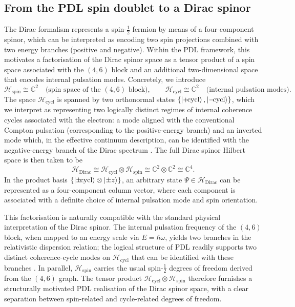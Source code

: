 \documentclass[11pt,a4paper]{article}
\theoremstyle{definition}
\newcommand{\Hspin}{\mathcal{H}_{\mathrm{spin}}}
\newcommand{\Hcycl}{\mathcal{H}_{\mathrm{cycl}}}
\newcommand{\HDirac}{\mathcal{H}_{\mathrm{Dirac}}}
\begin{document}
\subsection{From the PDL spin doublet to a Dirac spinor}

The Dirac formalism represents a spin-$\tfrac{1}{2}$ fermion by means of a four-component spinor, which can be interpreted as encoding two spin projections combined with two energy branches (positive and negative). Within the PDL framework, this motivates a factorisation of the Dirac spinor space as a tensor product of a spin space associated with the $(4,6)$ block and an additional two-dimensional space that encodes internal pulsation modes. Concretely, we introduce
\[
\Hspin \cong \mathbb{C}^2 \quad \text{(spin space of the $(4,6)$ block)}, \qquad \Hcycl \cong \mathbb{C}^2 \quad \text{(internal pulsation modes)}.
\]
The space $\Hcycl$ is spanned by two orthonormal states $\{\ket{+\!\text{cycl}},\ket{-\!\text{cycl}}\}$, which we interpret as representing two logically distinct regimes of internal coherence cycles associated with the electron: a mode aligned with the conventional Compton pulsation (corresponding to the positive-energy branch) and an inverted mode which, in the effective continuum description, can be identified with the negative-energy branch of the Dirac spectrum \cite{PDL,PDL_Global_Mapping_Structures_Results_Open_Problems}. The full Dirac spinor Hilbert space is then taken to be
\[
\HDirac \cong \Hcycl \otimes \Hspin \cong \mathbb{C}^2 \otimes \mathbb{C}^2 \cong \mathbb{C}^4.
\]
In the product basis $\{\ket{\pm\!\text{cycl}}\otimes\ket{\pm z}\}$, an arbitrary state $\Psi \in \HDirac$ can be represented as a four-component column vector, where each component is associated with a definite choice of internal pulsation mode and spin orientation.

This factorisation is naturally compatible with the standard physical interpretation of the Dirac spinor. The internal pulsation frequency of the $(4,6)$ block, when mapped to an energy scale via $E = \hbar\omega$, yields two branches in the relativistic dispersion relation; the logical structure of PDL readily supports two distinct coherence-cycle modes on $\Hcycl$ that can be identified with these branches \cite{PDL,PDL_introduction}. In parallel, $\Hspin$ carries the usual spin-$\tfrac{1}{2}$ degrees of freedom derived from the $(4,6)$ graph. The tensor product $\Hcycl \otimes \Hspin$ therefore furnishes a structurally motivated PDL realisation of the Dirac spinor space, with a clear separation between spin-related and cycle-related degrees of freedom.
\end{document}
